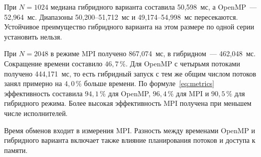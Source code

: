 При $N=1024$ медиана гибридного варианта составила 50,598~мс, а OpenMP~--- 52,964~мс. Диапазоны 50,200--51,712~мс и 49,174--54,998~мс пересекаются. Устойчивое преимущество гибридного варианта на этом размере по одной серии установить нельзя.

При $N=2048$ в режиме MPI получено 867,074~мс, в гибридном~--- 462,048~мс. Сокращение времени составило $46{,}7\,\%$. Для OpenMP с четырьмя потоками получено 444,171~мс, то есть гибридный запуск с тем же общим числом потоков занял примерно на $4{,}0\,\%$ больше времени. По формуле~\eqref{eq:metrics} эффективность составила $94{,}1\,\%$ для OpenMP, $96{,}4\,\%$ для MPI и $90{,}5\,\%$ для гибридного режима. Более высокая эффективность MPI получена при меньшем числе исполнителей.

Время обменов входит в измерения MPI. Разность между временами OpenMP и гибридного варианта включает также влияние планирования потоков и доступа к памяти.
